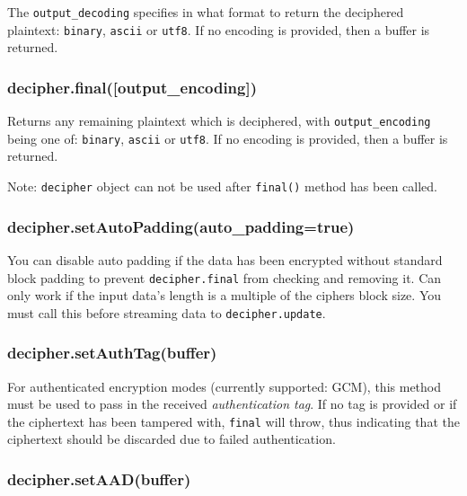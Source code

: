 The \texttt{output\_decoding} specifies in what format to return the
deciphered plaintext:
\texttt{\textquotesingle{}binary\textquotesingle{}},
\texttt{\textquotesingle{}ascii\textquotesingle{}} or
\texttt{\textquotesingle{}utf8\textquotesingle{}}. If no encoding is
provided, then a buffer is returned.

\subsubsection{decipher.final({[}output\_encoding{]})}\label{decipher.finaloutputux5fencoding}

Returns any remaining plaintext which is deciphered, with
\texttt{output\_encoding} being one of:
\texttt{\textquotesingle{}binary\textquotesingle{}},
\texttt{\textquotesingle{}ascii\textquotesingle{}} or
\texttt{\textquotesingle{}utf8\textquotesingle{}}. If no encoding is
provided, then a buffer is returned.

Note: \texttt{decipher} object can not be used after \texttt{final()}
method has been called.

\subsubsection{decipher.setAutoPadding(auto\_padding=true)}\label{decipher.setautopaddingautoux5fpaddingtrue}

You can disable auto padding if the data has been encrypted without
standard block padding to prevent \texttt{decipher.final} from checking
and removing it. Can only work if the input data's length is a multiple
of the ciphers block size. You must call this before streaming data to
\texttt{decipher.update}.

\subsubsection{decipher.setAuthTag(buffer)}\label{decipher.setauthtagbuffer}

For authenticated encryption modes (currently supported: GCM), this
method must be used to pass in the received \emph{authentication tag}.
If no tag is provided or if the ciphertext has been tampered with,
\texttt{final} will throw, thus indicating that the ciphertext should be
discarded due to failed authentication.

\subsubsection{decipher.setAAD(buffer)}\label{decipher.setaadbuffer}

